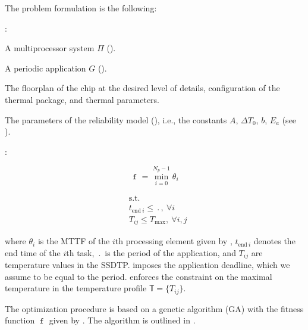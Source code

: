 The problem formulation is the following:

:
\begin{ilist}
  \item A multiprocessor system $\Pi$ ().
  \item A periodic application $G$ ().
  \item The floorplan of the chip at the desired level of details, configuration of the thermal package, and thermal parameters.
  \item The parameters of the reliability model (), i.e., the constants $A$, $\Delta T_0$, $b$, $E_a$ (see ).
\end{ilist}

:\vspace{-5pt}

\begin{minipage}{0.35\linewidth}
  \begin{equation} \label{eq:fitness-function}
    \mttf = \min_{i = 0}^{N_p - 1} \theta_i
  \end{equation}
\end{minipage}
\begin{minipage}{0.6\linewidth}
  \begin{align}
    & \text{s.t.} \nonumber \\
    & t_{\text{end} \: i} \leq \period, \: \forall i \label{eq:deadline} \\
    & T_{ij} \leq T_\text{max}, \: \forall i, j \label{eq:t-max}
  \end{align}
\end{minipage}\vspace{5pt}
where $\theta_i$ is the MTTF of the $i$th processing element given by , $t_{\text{end} \: i}$ denotes the end time of the $i$th task, $\period$ is the period of the application, and $T_{ij}$ are temperature values in the SSDTP.  imposes the application deadline, which we assume to be equal to the period.  enforces the constraint on the maximal temperature in the temperature profile $\mathbb{T} = \{ T_{ij} \}$.

The optimization procedure is based on a genetic algorithm (GA) \cite{schmitz2004} with the fitness function $\mttf$ given by . The algorithm is outlined in .
